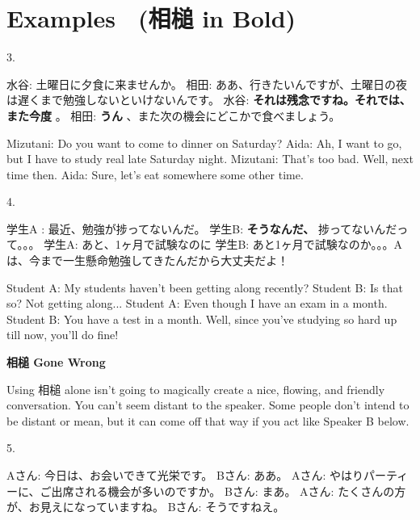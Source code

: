 \section{Examples　(相槌 in Bold)}
 
\par{3. }

\par{水谷: 土曜日に夕食に来ませんか。 \hfill\break
相田: ああ、行きたいんですが、土曜日の夜は遅くまで勉強しないといけないんです。 \hfill\break
水谷: \textbf{それは残念ですね。それでは、また今度 }。 \hfill\break
相田: \textbf{うん }、また次の機会にどこかで食べましょう。 }

\par{Mizutani: Do you want to come to dinner on Saturday? \hfill\break
Aida: Ah, I want to go, but I have to study real late Saturday night. \hfill\break
Mizutani: That's too bad. Well, next time then. \hfill\break
Aida: Sure, let's eat somewhere some other time. }

\par{4. }

\par{学生A : 最近、勉強が捗ってないんだ。 \hfill\break
学生B: \textbf{そうなんだ、 }捗ってないんだって。。。 \hfill\break
学生A: あと、1ヶ月で試験なのに \hfill\break
学生B: あと1ヶ月で試験なのか。。。Aは、今まで一生懸命勉強してきたんだから大丈夫だよ！ }

\par{Student A: My students haven't been getting along recently? \hfill\break
Student B: Is that so? Not getting along\dothyp{}\dothyp{}\dothyp{} \hfill\break
Student A: Even though I have an exam in a month. \hfill\break
Student B: You have a test in a month. Well, since you've studying so hard up till now, you'll do fine! }

\begin{center}
\textbf{相槌 Gone Wrong }
\end{center}

\par{  Using 相槌 alone isn't going to magically create a nice, flowing, and friendly conversation. You can't seem distant to the speaker. Some people don't intend to be distant or mean, but it can come off that way if you act like Speaker B below. }

\par{5. }

\par{Aさん: 今日は、お会いできて光栄です。 \hfill\break
Bさん: ああ。 \hfill\break
Aさん: やはりパーティーに、ご出席される機会が多いのですか。 \hfill\break
Bさん: まあ。 \hfill\break
Aさん: たくさんの方が、お見えになっていますね。 \hfill\break
Bさん: そうですねえ。  }

